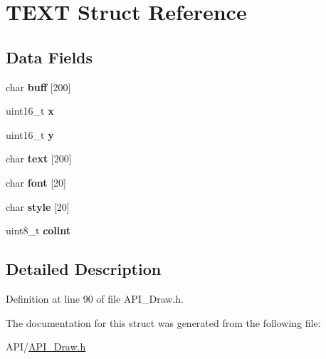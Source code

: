 \hypertarget{struct_t_e_x_t}{}\section{T\+E\+XT Struct Reference}
\label{struct_t_e_x_t}
\subsection*{Data Fields}
\begin{DoxyCompactItemize}
\item 
\mbox{\label{struct_t_e_x_t_a2f784963b0fa863258ed0ac79e9940fb}} 
char {\bfseries buff} \mbox{[}200\mbox{]}
\item 
\mbox{\label{struct_t_e_x_t_a4dde988b1b2adba65ae3efa69f65d960}} 
uint16\+\_\+t {\bfseries x}
\item 
\mbox{\label{struct_t_e_x_t_ab0580f504a7428539be299fa71565f30}} 
uint16\+\_\+t {\bfseries y}
\item 
\mbox{\label{struct_t_e_x_t_a50cee21aace972bab778fcf9df69a4ae}} 
char {\bfseries text} \mbox{[}200\mbox{]}
\item 
\mbox{\label{struct_t_e_x_t_a333e02dd657fb6d02f928075a9ed9119}} 
char {\bfseries font} \mbox{[}20\mbox{]}
\item 
\mbox{\label{struct_t_e_x_t_a34df1ac1fb51661ced6c422e491bf638}} 
char {\bfseries style} \mbox{[}20\mbox{]}
\item 
\mbox{\label{struct_t_e_x_t_a21caa4b27a71b7967f1a2d64f196a674}} 
uint8\+\_\+t {\bfseries colint}
\end{DoxyCompactItemize}


\subsection{Detailed Description}


Definition at line 90 of file A\+P\+I\+\_\+\+Draw.\+h.



The documentation for this struct was generated from the following file\+:\begin{DoxyCompactItemize}
\item 
A\+P\+I/\hyperlink{_a_p_i___draw_8h}{A\+P\+I\+\_\+\+Draw.\+h}\end{DoxyCompactItemize}
